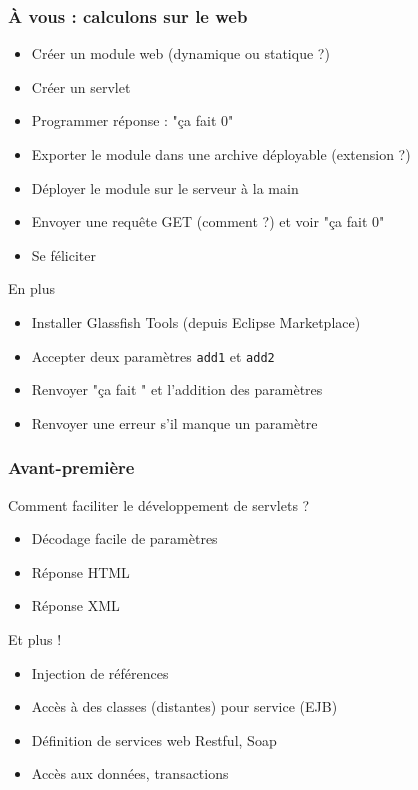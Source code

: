 \documentclass[english, french]{beamer}
\begin{document}
\begin{frame}
	\frametitle{À vous : calculons sur le web}
	\begin{itemize}
		\item Créer un module web (dynamique ou statique ?)
		\item Créer un servlet
		\item Programmer réponse : "ça fait 0"
		\item Exporter le module dans une archive déployable (extension ?)
		\item Déployer le module sur le serveur à la main
		\item Envoyer une requête GET (comment ?) et voir "ça fait 0"
		\item Se féliciter
	\end{itemize}
	\begin{block}{En plus}
		\begin{itemize}
			\item Installer Glassfish Tools (depuis Eclipse Marketplace)
			\item Accepter deux paramètres \texttt{add1} et \texttt{add2}
			\item Renvoyer "ça fait " et l’addition des paramètres
			\item Renvoyer une erreur s’il manque un paramètre
		\end{itemize}
	\end{block}
\end{frame}

\begin{frame}
	\frametitle{Avant-première}
	Comment faciliter le développement de servlets ?\pause
	\begin{itemize}
		\item Décodage facile de paramètres
		\item Réponse HTML
		\item Réponse XML
	\end{itemize}
	\pause
	\begin{block}{Et plus !}
		\begin{itemize}
			\item Injection de références
			\item Accès à des classes (distantes) pour service (EJB)
			\item Définition de services web Restful, Soap
			\item Accès aux données, transactions
		\end{itemize}
	\end{block}
\end{frame}
\end{document}
